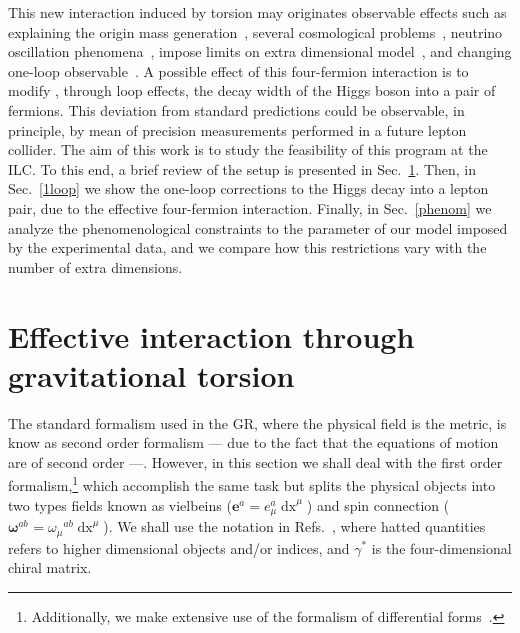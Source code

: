 \documentclass{ws-mpla}
\newcommand{\ga}{\gamma}
\newcommand\vi[2]{e^{{#1}}_{{#2}}}
\newcommand\vif[1]{\boldsymbol{e}^{{#1}}}
\newcommand\spi[1]{\omega_{{#1}}}
\newcommand\spif[2]{{\boldsymbol{\omega}}^{{#1}}{}_{{#2}}}
\renewcommand{\(}{\left(}
\renewcommand{\)}{\right)}
\renewcommand{\[}{\left[}
\renewcommand{\]}{\right]}
\newcommand*{\de}[1]{\mathop{\mathrm{d}#1}\nolimits}%
\begin{document}


This new interaction induced by torsion may originates observable effects such as explaining the origin mass generation~\cite{Castillo-Felisola:2013jva}, several cosmological problems~\cite{Poplawski:2010jv,Poplawski:2010kb,Poplawski:2011xf,Poplawski:2011wj,Fabbri:2012yg,Vignolo:2014wva}, neutrino oscillation phenomena~\cite{Capozziello:2013dja}, impose limits on extra dimensional model~\cite{Chang:2000yw,Lebedev:2002dp,CCSZ,Castillo-Felisola:2014iia}, and changing one-loop observable~\cite{Castillo-Felisola:2014xba}. A possible  effect of this four-fermion interaction is to modify , through loop effects, the decay width of the Higgs boson into a pair of fermions. This deviation from standard predictions could be observable, in principle, by mean of precision measurements performed in a future lepton collider. The  aim of this work is to study the feasibility of this program at the ILC. To this end, a brief review of the setup is presented in Sec.~\ref{CEG}. Then, in Sec.~\ref{1loop} we show the one-loop corrections to the Higgs decay into a lepton pair, due to the effective four-fermion interaction. Finally, in Sec.~\ref{phenom} we analyze the phenomenological constraints to the parameter of our model imposed by the experimental data, and we compare how this restrictions vary with the number of extra dimensions.



\section{Effective interaction through gravitational torsion}\label{CEG}

The standard formalism used in the GR, where the physical field is the metric, is know as second order formalism --- due to the fact that the equations of motion are of second order ---. However, in this section we shall deal with the first order formalism,\footnote{Additionally, we make extensive use of the formalism of differential forms~\cite{Cartan-calc,Zanelli:2005sa}.} which accomplish the same task but splits the physical objects into two types fields known as vielbeins \mbox{($\vif{a} = \vi{a}{\mu}\de{x}^\mu$)} and spin connection \mbox{($\spif{ab}{} = \spi{\mu}{}^{ab}\de{x}^\mu$).} We shall use the notation in Refs.~, where hatted quantities refers to higher dimensional objects and/or indices, and $\ga^{*}$ is the four-dimensional chiral matrix.
\end{document}
